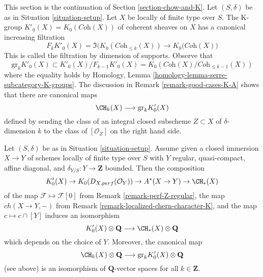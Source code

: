 \noindent
This section is the continuation of Section \ref{section-chow-and-K}.
Let $(S, \delta)$ be as in Situation \ref{situation-setup}.
Let $X$ be locally of finite type over $S$. The K-group
$K'_0(X) = K_0(\textit{Coh}(X))$ of coherent sheaves on $X$
has a canonical increasing filtration
$$
F_kK'_0(X) =
\Im\Big(K_0(\textit{Coh}_{\leq k}(X)) \to K_0(\textit{Coh}(X)\Big)
$$
This is called the filtration by dimension of supports. Observe that
$$
\text{gr}_k K'_0(X) \subset K'_0(X)/F_{k - 1}K'_0(X) =
K_0(\textit{Coh}(X)/\textit{Coh}_{\leq k - 1}(X))
$$
where the equality holds
by Homology, Lemma \ref{homology-lemma-serre-subcategory-K-groups}.
The discussion in Remark \ref{remark-good-cases-K-A} shows
that there are canonical maps
$$
\CH_k(X) \longrightarrow \text{gr}_k K'_0(X)
$$
defined by sending the class of an integral closed subscheme
$Z \subset X$ of $\delta$-dimension $k$ to the class of
$[\mathcal{O}_Z]$ on the right hand side.

\begin{proposition}
\label{proposition-K-tensor-Q}
Let $(S, \delta)$ be as in Situation \ref{situation-setup}. Assume given a
closed immersion $X \to Y$ of schemes locally of finite type over $S$
with $Y$ regular, quasi-compact, affine diagonal, and
$\delta_{Y/S} : Y \to \mathbf{Z}$ bounded. Then the composition
$$
K'_0(X) \to
K_0(D_{X, perf}(\mathcal{O}_Y)) \to
A^*(X \to Y) \to
\CH_*(X)
$$
of the map $\mathcal{F} \mapsto \mathcal{F}[0]$ from
Remark \ref{remark-perf-Z-regular}, the map $ch(X \to Y, -)$ from
Remark \ref{remark-localized-chern-character-K}, and
the map $c \mapsto c \cap [Y]$ induces an isomorphism
$$
K'_0(X) \otimes \mathbf{Q}
\longrightarrow
\CH_*(X) \otimes \mathbf{Q}
$$
which depends on the choice of $Y$. Moreover, the canonical map
$$
\CH_k(X) \otimes \mathbf{Q}
\longrightarrow
\text{gr}_k K'_0(X) \otimes \mathbf{Q}
$$
(see above) is an isomorphism of $\mathbf{Q}$-vector spaces for all
$k \in \mathbf{Z}$.
\end{proposition}

